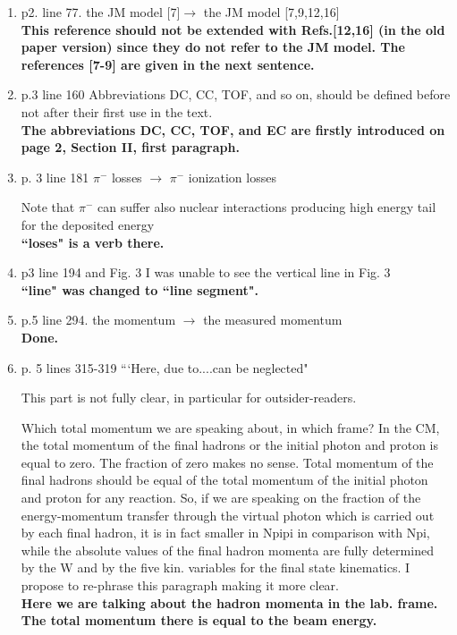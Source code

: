 \documentclass[,superscriptaddress,showpacs,amssymb,amsmath,amsfonts,linenumbers,article]{revtex4-1}
\begin{document}
\begin{enumerate}

\item p2. line 77. the JM model [7]$\rightarrow$ the JM model [7,9,12,16]\\
{\bf This reference should not be extended with Refs.[12,16] (in the old paper version) since they do not refer to the JM model. The references [7-9] are given in the next sentence.}


\item p.3 line 160 Abbreviations DC, CC, TOF, and so on, should be defined before not after their first use in the text.\\[0.5cm]
{\bf The abbreviations DC, CC, TOF, and EC are firstly introduced on page 2, Section II, first paragraph. }


\item  p. 3 line 181 $\pi^-$ losses $\rightarrow$ $\pi^-$ ionization losses

Note that $\pi^-$ can suffer also nuclear interactions producing high energy tail for the deposited energy\\[0.5cm]
{\bf  ``loses" is a verb there.  }

\item p3 line 194 and Fig. 3 I was unable to see the vertical line in Fig. 3\\[0.5cm]
{\bf  ``line"  was changed to ``line segment". }


\item  p.5 line 294. the momentum $\rightarrow$ the measured momentum\\[0.5cm]
{\bf  Done. }


\item p. 5 lines 315-319 ```Here, due to....can be neglected"

This part is not fully clear, in particular for outsider-readers.

Which total momentum we are speaking about, in which frame? In the CM, the total momentum of the final hadrons or the initial photon and proton is equal to zero. The fraction of zero makes no sense. Total momentum of the final hadrons should be equal of the total momentum of the initial photon and proton for any reaction. So, if we are speaking on the fraction of the energy-momentum transfer through the virtual photon which is carried out by each final hadron, it is in fact smaller in Npipi in comparison with Npi, while the absolute values of the final hadron momenta are fully determined by the W and by the five kin. variables for the final state kinematics. I propose to re-phrase this paragraph making it more clear.\\
{\bf Here we are talking about the hadron momenta in the lab. frame. The total momentum there is equal to the beam energy.}





\end{enumerate}
\end{document}
